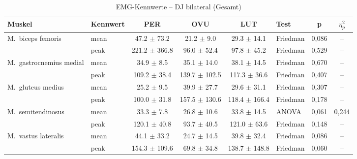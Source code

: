 \begin{table}[H]
  \centering
  \caption{EMG-Kennwerte – DJ bilateral (Gesamt)}
  \label{tab:DJ_bilateral_Gesamt}
  \small
  \begin{tabular}{l l c c c l c c}
    \hline
    \textbf{Muskel} & \textbf{Kennwert} & \textbf{PER} & \textbf{OVU} & \textbf{LUT} & \textbf{Test} & \textbf{p} & \textbf{$\eta^2_p$} \\
    \hline
    M.~biceps femoris & mean & 47.2 $\pm$ 73.2 & 21.2 $\pm$ 9.0 & 29.3 $\pm$ 14.1 & Friedman & 0{,}086 & -- \\
     & peak & 221.2 $\pm$ 366.8 & 96.0 $\pm$ 52.4 & 97.8 $\pm$ 45.2 & Friedman & 0{,}529 & -- \\
    \hline
    M.~gastrocnemius medial & mean & 34.9 $\pm$ 8.5 & 35.1 $\pm$ 14.0 & 38.1 $\pm$ 14.5 & Friedman & 0{,}670 & -- \\
     & peak & 109.2 $\pm$ 38.4 & 139.7 $\pm$ 102.5 & 117.3 $\pm$ 36.6 & Friedman & 0{,}407 & -- \\
    \hline
    M.~gluteus medius & mean & 25.2 $\pm$ 9.5 & 39.9 $\pm$ 27.7 & 29.6 $\pm$ 31.1 & Friedman & 0{,}307 & -- \\
     & peak & 100.0 $\pm$ 31.8 & 157.5 $\pm$ 130.6 & 118.4 $\pm$ 166.4 & Friedman & 0{,}178 & -- \\
    \hline
    M.~semitendinosus & mean & 33.3 $\pm$ 7.8 & 26.8 $\pm$ 10.6 & 33.8 $\pm$ 14.5 & ANOVA & 0{,}061 & 0{,}244 \\
     & peak & 120.1 $\pm$ 40.8 & 93.7 $\pm$ 40.5 & 121.0 $\pm$ 63.6 & Friedman & 0{,}148 & -- \\
    \hline
    M.~vastus lateralis & mean & 44.1 $\pm$ 33.2 & 24.7 $\pm$ 14.5 & 39.8 $\pm$ 32.4 & Friedman & 0{,}086 & -- \\
     & peak & 154.3 $\pm$ 109.6 & 69.8 $\pm$ 34.8 & 138.7 $\pm$ 148.8 & Friedman & 0{,}060 & -- \\
    \hline
  \end{tabular}
\end{table}

